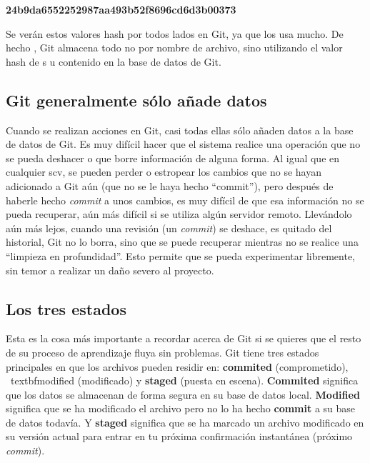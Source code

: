 \documentclass[12pt, spanish, oneside, onecolumn, a4paper]{report}
\begin{document}
\textbf{24b9da6552252987aa493b52f8696cd6d3b00373}

Se verán estos valores hash por todos lados en Git, ya que los usa mucho. De hecho , Git almacena todo no por nombre de archivo, sino utilizando el valor hash de s u contenido en la base de datos de Git.

\subsection{Git generalmente sólo añade datos} 
\label{sec:Gitonlyaddsdata}

Cuando se realizan acciones en Git, casi todas ellas sólo añaden datos a la base de datos de Git. Es muy difícil hacer que el sistema realice una operación que no se pueda deshacer o que borre información de alguna forma. Al igual que en cualquier \gls{scv}, se pueden perder o estropear los cambios que no se hayan adicionado a Git aún (que no se le haya hecho ``commit''), pero después de haberle hecho \emph{commit} a unos cambios, es muy difícil de que esa información no se pueda recuperar, aún más difícil si se utiliza algún servidor remoto. Llevándolo aún más lejos, cuando una revisión (un \emph{commit}) se deshace, es quitado del historial, Git no lo borra, sino que se puede recuperar mientras no se realice una ``limpieza en profundidad''. Esto permite que se pueda experimentar libremente, sin temor a realizar un daño severo al proyecto. 

\subsection{Los tres estados} 
\label{sec:threestates} Esta es la cosa más importante a recordar acerca de Git si se quieres que el resto de su proceso de aprendizaje fluya sin problemas. Git tiene tres estados principales en que los archivos pueden residir en: 
\textbf{commited} (comprometido), \ textbf{modified} (modificado) y \textbf{staged} (puesta en escena). \textbf{Commited} significa que los datos se almacenan de forma segura en su base de datos local. \textbf{Modified} significa que se ha modificado el archivo pero no lo ha hecho \textbf{commit} a su base de datos todavía. Y \textbf{staged} significa que se ha marcado un archivo modificado en su versión actual para entrar en tu próxima confirmación instantánea (próximo \emph{commit}). 
\end{document}
